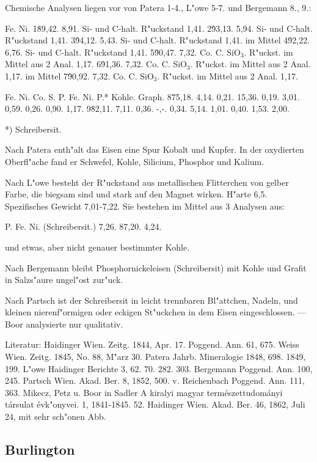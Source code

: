 \documentclass[a4paper, 11pt, oneside]{article}
\begin{document}
Chemische Analysen liegen vor von Patera 1-4., L"owe 5-7. und Bergemann 8., 9.:

Fe. Ni.  
1\. 89,42. 8,91. Si- und C-halt. R"uckstand 1,41.  
2\. 93,13. 5,94. Si- und C-halt. R"uckstand 1,41.  
3\. 94,12. 5,43.  Si- und C-halt. R"uckstand 1,41.  
im Mittel 4\. 92,22. 6,76. Si- und C-halt. R"uckstand 1,41.  
5\. 90,47. 7,32. Co. C. SiO$_{3}$. R"uckst. im Mittel aus 2 Anal. 1,17.  
6\. 91,36. 7,32. Co. C. SiO$_{3}$. R"uckst. im Mittel aus 2 Anal. 1,17.  
im Mittel 7\. 90,92. 7,32. Co. C. SiO$_{3}$. R"uckst. im Mittel aus 2 Anal. 1,17.  

Fe. Ni. Co. S. P. {Fe. Ni. P.}* Kohle. Graph.  
8\. 75,18. 4,14. 0,21. 15,36. 0,19. 3,01. 0,59. 0,26. 0,90. 1,17.  
9\. 82,11. 7,11. 0,36. -,-. 0,34. 5,14. 1,01. 0,40. 1,53. 2,00.

*) Schreibersit.

Nach Patera enth"alt das Eisen eine Spur Kobalt und Kupfer. In der oxydierten Oberfl"ache fand er Schwefel, Kohle, Silicium, Phosphor und Kalium.

Nach L"owe besteht der R"uckstand aus metallischen Flitterchen von gelber Farbe, die biegsam sind und stark auf den Magnet wirken. H"arte 6,5. Spezifisches Gewicht 7,01-7,22. Sie bestehen im Mittel aus 3 Analysen aus:

P. Fe. Ni. (Schreibersit.)  
7,26. 87,20. 4,24.

und etwas, aber nicht genauer bestimmter Kohle.

Nach Bergemann bleibt Phosphornickeleisen (Schreibersit) mit Kohle und Grafit in Salzs"aure ungel"ost zur"uck.

Nach Partsch ist der Schreibersit in leicht trennbaren Bl"attchen, Nadeln, und kleinen nierenf"ormigen oder eckigen St"uckchen in dem Eisen eingeschlossen. --- Boor analysierte nur qualitativ.

Literatur: Haidinger Wien. Zeitg. 1844, Apr. 17. Poggend. Ann. 61, 675. Weiss Wien. Zeitg. 1845, No. 88, M"arz 30. Patera Jahrb. Mineralogie 1848, 698. 1849, 199. L"owe Haidinger Berichte 3, 62. 70. 282. 303. Bergemann Poggend. Ann. 100, 245. Partsch Wien. Akad. Ber. 8, 1852, 500. v. Reichenbach Poggend. Ann. 111, 363. Mikecz, Petz u. Boor in Sadler A kiralyi magyar természettudományi társulat évk"onyvei. 1, 1841-1845. 52. Haidinger Wien. Akad. Ber. 46, 1862, Juli 24, mit sehr sch"onen Abb.

\subsection{Burlington}
\end{document}
